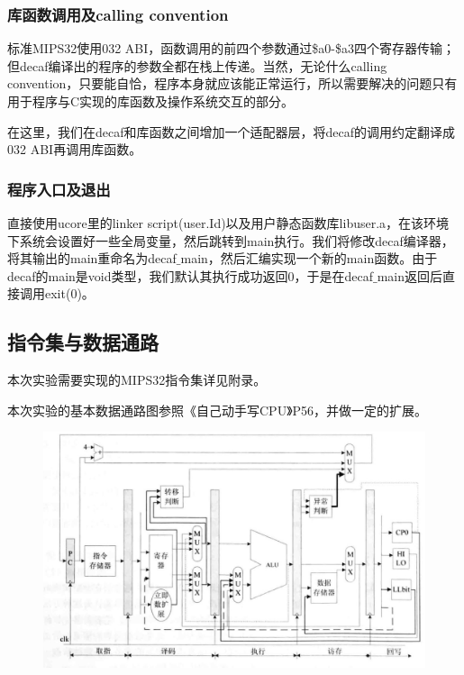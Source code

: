 \subsubsection{库函数调用及calling convention}
标准MIPS32使用032 ABI，函数调用的前四个参数通过\$a0-\$a3四个寄存器传输；但decaf编译出的程序的参数全都在栈上传递。当然，无论什么calling convention，只要能自恰，程序本身就应该能正常运行，所以需要解决的问题只有用于程序与C实现的库函数及操作系统交互的部分。

在这里，我们在decaf和库函数之间增加一个适配器层，将decaf的调用约定翻译成032 ABI再调用库函数。
\subsubsection{程序入口及退出}
直接使用ucore里的linker script(user.Id)以及用户静态函数库libuser.a，在该环境下系统会设置好一些全局变量，然后跳转到main执行。我们将修改decaf编译器，将其输出的main重命名为decaf$\_$main，然后汇编实现一个新的main函数。由于decaf的main是void类型，我们默认其执行成功返回0，于是在decaf$\_$main返回后直接调用exit(0)。
\subsection{指令集与数据通路}
本次实验需要实现的MIPS32指令集详见附录。

本次实验的基本数据通路图参照《自己动手写CPU》P56，并做一定的扩展。

\begin{figure}
\centering
\includegraphics[scale=0.2]{datapath.eps}
\end{figure}
